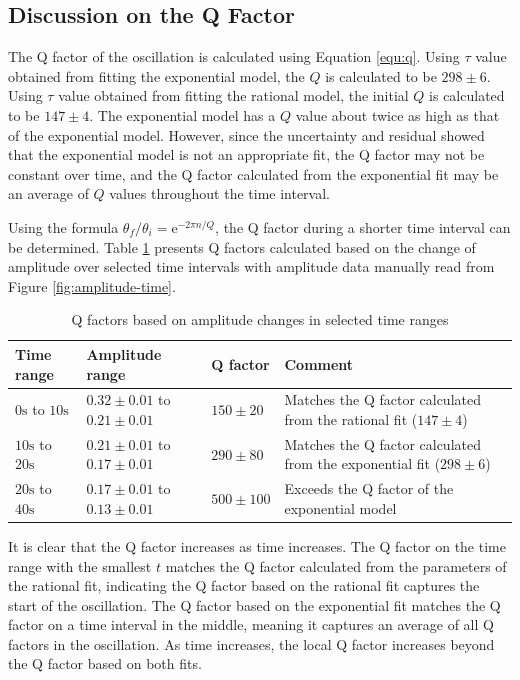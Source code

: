 \documentclass[12pt]{article}
\newcommand{\e}{\mathrm{e}}
\begin{document}
\subsection{Discussion on the Q Factor} \label{section:q}

The Q factor of the oscillation is calculated using Equation \ref{equ:q}. Using $\tau$ value obtained from fitting the exponential model, the $Q$ is calculated to be $298\pm6$. Using $\tau$ value obtained from fitting the rational model, the initial $Q$ is calculated to be $147\pm4$. The exponential model has a $Q$ value about twice as high as that of the exponential model. However, since the uncertainty and residual showed that the exponential model is not an appropriate fit, the Q factor may not be constant over time, and the Q factor calculated from the exponential fit may be an average of $Q$ values throughout the time interval.

Using the formula $\theta_f/\theta_i=\e^{-2\pi n/Q}$, the Q factor during a shorter time interval can be determined. Table {\ref{table:q-change}} presents Q factors calculated based on the change of amplitude over selected time intervals with amplitude data manually read from Figure {\ref{fig:amplitude-time}}.

\begin{table}[h]
\begin{tabularx}{\textwidth}{ |l|l|l|X| }
\hline
Time range &
Amplitude range &
Q factor &
Comment
\\ \hline
$0\mathrm{s}$ to $10\mathrm{s}$ &
$0.32\pm0.01$ to $0.21\pm0.01$ &
$150\pm20$ &
Matches the Q factor calculated from the rational fit ($147\pm4$)
\\ \hline
$10\mathrm{s}$ to $20\mathrm{s}$ &
$0.21\pm0.01$ to $0.17\pm0.01$ &
$290\pm80$ &
Matches the Q factor calculated from the exponential fit ($298\pm6$)
\\ \hline
$20\mathrm{s}$ to $40\mathrm{s}$ &
$0.17\pm0.01$ to $0.13\pm0.01$ &
$500\pm100$ &
Exceeds the Q factor of the exponential model
\\ \hline
\end{tabularx}
\caption{Q factors based on amplitude changes in selected time ranges}
\label{table:q-change}
\end{table}

It is clear that the Q factor increases as time increases. The Q factor on the time range with the smallest $t$ matches the Q factor calculated from the parameters of the rational fit, indicating the Q factor based on the rational fit captures the start of the oscillation. The Q factor based on the exponential fit matches the Q factor on a time interval in the middle, meaning it captures an average of all Q factors in the oscillation. As time increases, the local Q factor increases beyond the Q factor based on both fits.
\end{document}
